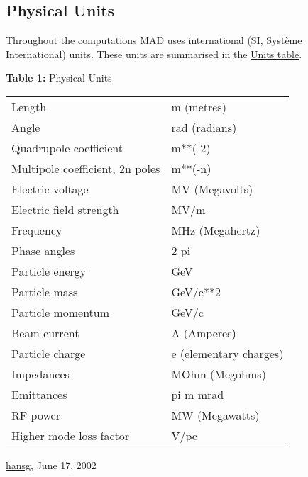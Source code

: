 




\subsection{Physical Units}
 Throughout the computations MAD uses international (SI, Syst\`eme International) units. These units are summarised in the \hyperlink{table}{Units table}. 

\begin{table}[h]
\begin{center}
{\textbf{Table 1:} Physical Units}
\\
\begin{tabular}{l | l}
Length                  & m (metres) \\ 
Angle                   & rad (radians) \\ 
Quadrupole coefficient  & m**(-2) \\ 
Multipole coefficient, 2n poles   & m**(-n) \\ 
Electric voltage        & MV (Megavolts) \\ 
Electric field strength & MV/m \\ 
Frequency               & MHz (Megahertz) \\ 
Phase angles            & 2 pi \\ 
Particle energy         & GeV \\ 
Particle mass           & GeV/c**2 \\ 
Particle momentum       & GeV/c \\ 
Beam current            & A (Amperes) \\ 
Particle charge         & e (elementary charges) \\ 
Impedances              & MOhm (Megohms) \\ 
Emittances              & pi m mrad \\ 
RF power                & MW (Megawatts) \\ 
Higher mode loss factor & V/pc
\end{tabular}
\end{center}
\end{table}


\href{http://www.cern.ch/Hans.Grote/hansg_sign.html}{hansg}, June 17, 2002 

